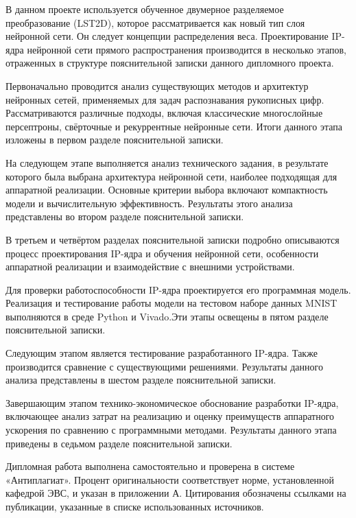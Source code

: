 В данном проекте 
используется обученное двумерное разделяемое преобразование (LST2D), которое 
рассматривается как новый тип слоя нейронной сети. Он следует концепции 
распределения веса. Проектирование IP-ядра нейронной сети прямого 
распространения производится в несколько этапов, отраженных в структуре 
пояснительной записки данного дипломного проекта.

Первоначально проводится анализ существующих методов и архитектур нейронных 
сетей, применяемых для задач распознавания рукописных цифр. Рассматриваются 
различные подходы, включая классические многослойные персептроны, свёрточные 
и рекуррентные нейронные сети. Итоги данного этапа изложены в первом разделе 
пояснительной записки.

На следующем этапе выполняется анализ технического задания, в результате которого 
была выбрана архитектура нейронной сети, наиболее подходящая для аппаратной 
реализации. Основные критерии выбора включают компактность модели и 
вычислительную эффективность. Результаты этого анализа представлены во втором 
разделе пояснительной записки.

В третьем и четвёртом разделах пояснительной записки подробно описываются 
процесс проектирования IP-ядра и обучения нейронной сети, особенности 
аппаратной реализации и взаимодействие с внешними устройствами.

Для проверки работоспособности IP-ядра проектируется его программная модель. 
Реализация и тестирование работы модели на тестовом наборе данных 
MNIST выполняются в среде Python и Vivado.\@ Эти этапы освещены в пятом 
разделе пояснительной записки.

Следующим этапом является тестирование разработанного IP-ядра. 
Также производится сравнение с существующими решениями. 
Результаты данного анализа представлены в шестом разделе 
пояснительной записки.

Завершающим этапом технико-экономическое обоснование разработки IP-ядра, 
включающее анализ затрат на реализацию и оценку преимуществ аппаратного 
ускорения по сравнению с программными методами. Результаты данного этапа 
приведены в седьмом разделе пояснительной записки.

Дипломная работа выполнена самостоятельно и проверена в системе 
«Антиплагиат». Процент оригинальности соответствует норме, установленной 
кафедрой ЭВС, и указан в приложении А. Цитирования обозначены ссылками на 
публикации, указанные в списке использованных источников.